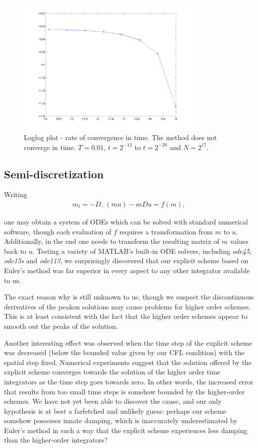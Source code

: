 \begin{figure}[h]
        \centering
        \includegraphics[width=0.8\textwidth]{gfx/loglog2time}
        \caption{Loglog plot - rate of convergence in time. The method does not converge in time. $T = 0.01$, $t = 2^{-13}$ to $ t = 2^{-20}$ and $N = 2^{17}$.}
        \label{fig:loglog2time}
\end{figure}



\subsection*{Semi-discretization}
Writing 
\begin{align*}
m_t = - D_- (m u) - m D u = f(m),
\end{align*}

one may obtain a system of ODEs which can be solved with standard numerical software, though each evaluation of $f$ requires a transformation from $m$ to $u$. Additionally, in the end one needs to transform the resulting matrix of $m$ values back to $u$. Testing a variety of MATLAB's built-in ODE solvers, including \emph{ode45}, \emph{ode15s} and \emph{ode113}, we surprisingly discovered that our explicit scheme based on Euler's method was far superior in every aspect to any other integrator available to us. 

The exact reason why is still unknown to us, though we suspect the discontinuous derivatives of the peakon solutions may cause problems for higher order schemes. This is at least consistent with the fact that the higher order schemes appear to smooth out the peaks of the solution.

Another interesting effect was observed when the time step of the explicit scheme was decreased (below the bounded value given by our CFL condition) with the spatial step fixed. Numerical experiments suggest that the solution offered by the explicit scheme converges towards the solution of the higher order time integrators as the time step goes towards zero. In other words, the increased error that results from too small time steps is somehow bounded by the higher-order schemes. We have not yet been able to discover the cause, and our only hypothesis is at best a farfetched and unlikely guess: perhaps our scheme somehow possesses innate damping, which is inaccurately underestimated by Euler's method in such a way that the explicit scheme experiences less damping than the higher-order integrators?
